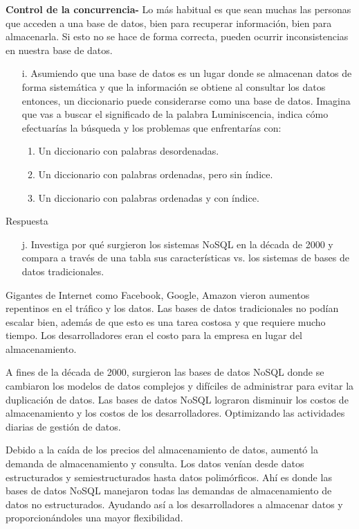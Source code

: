 \documentclass{article}
\begin{document}
\begin{enumerate}
\begin{enumerate}
\textbf{Control de la concurrencia- }Lo más habitual es que sean muchas las personas que acceden a una base de datos, bien para recuperar información, bien para almacenarla. Si esto no se hace de forma correcta, pueden ocurrir inconsistencias en nuestra base de datos.
\end{enumerate}    
\begin{itemize}
    \item[i.]Asumiendo que una base de datos es un lugar donde se almacenan datos de forma sistemática y que la información se obtiene al consultar los datos entonces, un diccionario puede considerarse como una base de datos. Imagina que vas a buscar el significado de la palabra Luminiscencia, indica cómo efectuarías la búsqueda y los problemas que enfrentarías con:
    \begin{enumerate}
        \item Un diccionario con palabras desordenadas.
        \item Un diccionario con palabras ordenadas, pero sin índice.
        \item Un diccionario con palabras ordenadas y con índice.
    \end{enumerate}
    \end{itemize}
    
    Respuesta
    
\begin{itemize}
    \item[j.]Investiga por qué surgieron los sistemas NoSQL en la década de 2000 y compara a través de una tabla sus características vs. los sistemas de bases de datos tradicionales.
    \end{itemize}
    Gigantes de Internet como Facebook, Google, Amazon vieron aumentos repentinos en el tráfico y los datos. Las bases de datos tradicionales no podían escalar bien, además de que esto es una tarea costosa y que requiere mucho tiempo. Los desarrolladores eran el costo para la empresa en lugar del almacenamiento. 
 
   A fines de la década de 2000, surgieron las bases de datos NoSQL donde se cambiaron los modelos de datos complejos y difíciles de administrar para evitar la duplicación de datos. 
   Las bases de datos NoSQL lograron disminuir los costos de almacenamiento y  los costos de los desarrolladores. Optimizando las actividades diarias de gestión de datos.

   Debido a la caída de los precios del almacenamiento de datos, aumentó la demanda de almacenamiento y consulta. Los datos venían desde datos estructurados y semiestructurados hasta datos polimórficos. Ahí es donde las bases de datos NoSQL manejaron todas las demandas de almacenamiento de datos no estructurados. Ayudando así a los desarrolladores a almacenar datos y proporcionándoles una mayor flexibilidad.
   

\end{enumerate}
\end{document}

